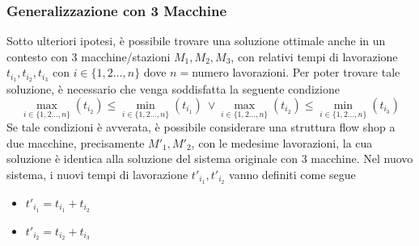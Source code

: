 \documentclass[10pt, letterpaper]{report}
\begin{document}
\subsubsection{Generalizzazione con 3 Macchine}
Sotto ulteriori ipotesi, è possibile trovare una soluzione ottimale anche in un contesto con 3 macchine/stazioni $M_1,M_2,M_3$, 
con relativi tempi di lavorazione $t_{i_1},t_{i_2},t_{i_3}$ con $i\in\{1,2\dots ,n\}$ dove $n=$numero 
lavorazioni. Per poter 
trovare tale soluzione, è necessario che venga soddisfatta la seguente condizione 
$$ \max_{i\in\{1,2\dots ,n\}}(t_{i_2})\le \min_{i\in\{1,2\dots ,n\}}(t_{i_1}) \ \lor  
\max_{i\in\{1,2\dots ,n\}}(t_{i_2}) \le \min_{i\in\{1,2\dots ,n\}}(t_{i_3}) $$
Se tale condizioni è avverata, è possibile considerare una struttura flow shop a due macchine, precisamente $M'_1,M'_2$, con le 
medesime lavorazioni, la cua soluzione è identica alla soluzione del sistema originale con 3 macchine.\acc 
Nel nuovo sistema, i nuovi tempi di lavorazione $t'_{i_1},t'_{i_2}$ vanno definiti come segue \begin{itemize}
    \item $t'_{i_1}=t_{i_1}+t_{i_2}$
    \item $t'_{i_2}=t_{i_2}+t_{i_3}$
\end{itemize}
\end{document}
